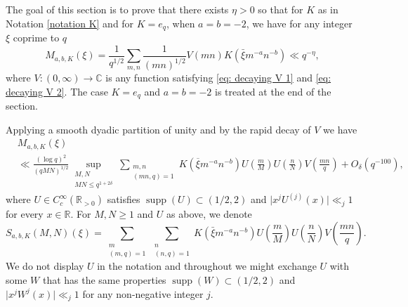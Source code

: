 \documentclass[12pt]{amsart}
\theoremstyle{plain}
\theoremstyle{definition}
\theoremstyle{remark}
\numberwithin{equation}{section}
\newcommand{\RR}{\mathbb{R}}
\newcommand{\CC}{\mathbb{C}}
\renewcommand{\geq}{\geqslant}
\renewcommand{\leq}{\leqslant}
\begin{document}
The goal of this section is to prove that there exists $\eta>0$ so that for $K$ as in Notation \ref{notation K} and for $K = e_q$, when $a=b=-2$, we have for any integer $\xi$ coprime to $q$ 
\begin{equation}\label{eq:goal of section 4}
    M_{a,b,K}(\xi)  
 = \frac{1}{q^{1/2}}\sum_{m,n}\frac{1}{(mn)^{1/2}}V(mn)K(\bar \xi m^{-a}n^{-b})\ll q^{-\eta},\end{equation}
 where $V\colon (0,\infty) \to \CC$ is any function satisfying \eqref{eq: decaying V 1} and \eqref{eq: decaying V 2}.
The case $K=e_q$ and $a=b=-2$ is treated at the end of the section.

 
 Applying a smooth dyadic partition of unity and by the rapid decay of $V$ we have
\begin{align*}
&M_{a,b,K}(\xi) \\&\ll \frac{(\log q)^2}{(qMN)^{1/2}} \sup_{\substack{M,N\\MN\leq q^{1+2\delta}}}\sum_{\substack{m,n\\(mn,q)=1}}K(\overline{\xi} m^{-a}n^{-b})U\left(\frac{m}{M}\right)U\left(\frac{n}{N}\right)V\left(\frac{mn}{q}\right) + O_{\delta}(q^{-100}),\end{align*}
where $U\in C_c^{\infty}(\RR_{>0})$ satisfies $\operatorname{supp}(U) \subset (1/2,2)$ and $\vert{x^jU^{(j)}(x)}\vert \ll_j 1$ for every $x\in \RR$. 
For $M,N\geq 1$ and $U$ as above, we denote \begin{equation}\label{eq: defi S_abK}
S_{a,b,K}(M,N)(\xi)=\sum_{\substack{m\\(m,q)=1}}\sum_{\substack{n\\(n,q)=1}}K(\bar \xi m^{-a}n^{-b})U\left(\frac{m}{M}\right)U\left(\frac{n}{N}\right)V\left(\frac{mn}{q}\right).\end{equation}
We do not display $U$ in the notation and throughout we might exchange $U$ with some $W$ that has the same properties $\operatorname {supp}(W) \subset (1/2,2)$ and $\vert x^jW^j(x) \vert \ll_j 1$ for any non-negative integer $j$.
\end{document}
